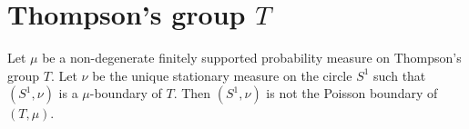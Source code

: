 \section{Thompson's group $T$}

\begin{thm}
Let $\mu$ be a non-degenerate finitely supported probability measure on Thompson's group $T$. Let $\nu$ be the unique stationary measure on the circle $S^1$ such that $(S^1,\nu)$ is a $\mu$-boundary of $T$. Then $(S^1,\nu)$ is not the Poisson boundary of $(T,\mu)$.
\end{thm}